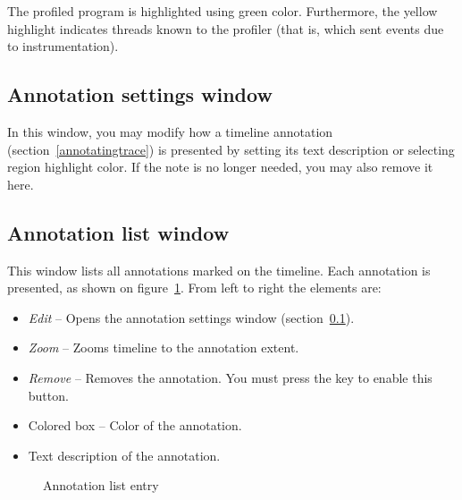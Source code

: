 \documentclass[hidelinks,titlepage,a4paper,twoside]{article}
\begin{document}
The profiled program is highlighted using green color. Furthermore, the yellow highlight indicates threads known to the profiler (that is, which sent events due to instrumentation).

\subsection{Annotation settings window}
\label{annotationsettings}

In this window, you may modify how a timeline annotation (section~\ref{annotatingtrace}) is presented by setting its text description or selecting region highlight color. If the note is no longer needed, you may also remove it here.

\subsection{Annotation list window}
\label{annotationlist}

This window lists all annotations marked on the timeline. Each annotation is presented, as shown on figure~\ref{figannlist}. From left to right the elements are:

\begin{itemize}
\item \emph{\faPenToSquare{} Edit} -- Opens the annotation settings window (section~\ref{annotationsettings}).
\item \emph{\faMicroscope{} Zoom} -- Zooms timeline to the annotation extent.
\item \emph{\faTrashCan{} Remove} -- Removes the annotation. You must press the \keys{\ctrl} key to enable this button.
\item Colored box -- Color of the annotation.
\item Text description of the annotation.
\end{itemize}

\begin{figure}[h]
\centering{}
\caption{Annotation list entry}
\label{figannlist}
\end{figure}
\end{document}
